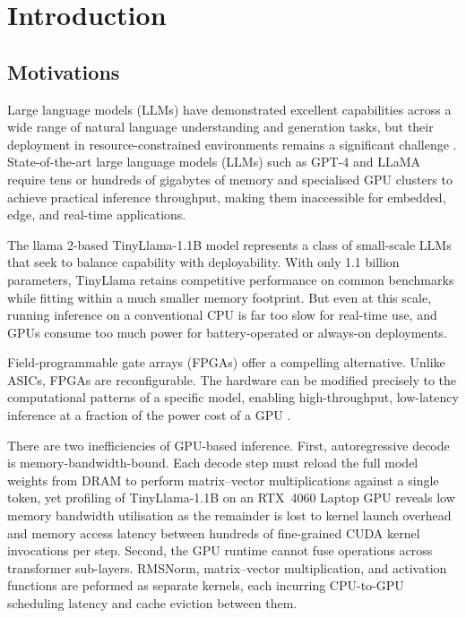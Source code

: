 %

\chapter{Introduction}
\label{ch:introduction}

\section{Motivations}
\label{sec:motivations}

Large language models (LLMs) have demonstrated excellent capabilities
across a wide range of natural language understanding and generation tasks,
but their deployment in resource-constrained environments remains a
significant challenge \cite{tay2022efficient}. State-of-the-art large language models (LLMs) 
such as GPT-4 and LLaMA require tens or hundreds of gigabytes of memory and specialised
GPU clusters to achieve practical inference throughput, making them
inaccessible for embedded, edge, and real-time applications.

The llama 2-based TinyLlama-1.1B model \cite{zhang2024tinyllama} represents a class of 
small-scale LLMs that seek to balance capability with deployability. With only 1.1 billion
parameters,
TinyLlama retains competitive performance on common benchmarks while fitting
within a much smaller memory footprint. But even at this scale,
running inference on a conventional CPU is far too slow for real-time use,
and GPUs consume too much power for battery-operated or always-on deployments.

Field-programmable gate arrays (FPGAs) offer a compelling alternative.
Unlike ASICs, FPGAs are reconfigurable. The hardware can be
modified precisely to the computational patterns of a specific model, enabling
high-throughput, low-latency inference at a fraction of the power cost of a GPU
\cite{xilinx2021vitishls}. 

There are two inefficiencies of GPU-based inference. 
First, autoregressive decode is memory-bandwidth-bound. Each decode
step must reload the full model weights from DRAM to perform matrix--vector
multiplications against a single token, yet profiling of TinyLlama-1.1B on an
RTX~4060 Laptop GPU reveals low memory bandwidth utilisation as the 
remainder is lost to kernel launch overhead and memory access latency between
hundreds of fine-grained CUDA kernel invocations per step. Second, the GPU
runtime cannot fuse operations across transformer sub-layers. RMSNorm,
matrix--vector multiplication, and activation functions are peformed as
separate kernels, each incurring CPU-to-GPU scheduling latency and cache
eviction between them. 

